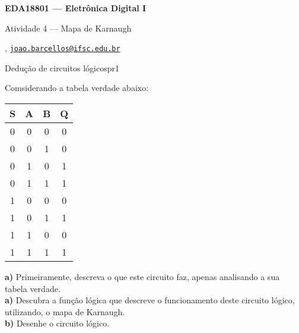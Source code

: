 



\usepackage[style=numeric, citestyle=ieee]{biblatex}




\begin{Large}
    \textbf{EDA18801 --- Eletrônica Digital I}
    
    Atividade 4 --- Mapa de Karnaugh \hfill {}
\end{Large}

\vspace{1ex}
\textbf{} , \href{mailto:joao.barcellos@ifsc.edu.br}{\texttt{joao.barcellos@ifsc.edu.br}}\\
\textbf{}

\vspace{2ex}

\begin{problem}{Dedução de circuitos lógicos}{pr1}

Comsiderando a tabela verdade abaixo: \\

\begin{center}
    \begin{tabular}{| c | c | c | c |}
      \hline
      \rowcolor{Gray}
      S & A & B & Q \\
      \hline
      0 & 0 & 0 & 0 \\
      0 & 0 & 1 & 0 \\
      0 & 1 & 0 & 1 \\
      0 & 1 & 1 & 1 \\
      1 & 0 & 0 & 0 \\
      1 & 0 & 1 & 1 \\
      1 & 1 & 0 & 0 \\
      1 & 1 & 1 & 1 \\
      \hline
    \end{tabular}
\end{center}

\textbf{a)} Primeiramente, descreva o que este circuito faz, apenas analisando a sua tabela verdade. \\

\textbf{a)} Descubra a função lógica que descreve o funcionamento deste circuito lógico, utilizando, o mapa de Karnaugh. \\

\textbf{b)} Desenhe o circuito lógico. \\

\end{problem}

